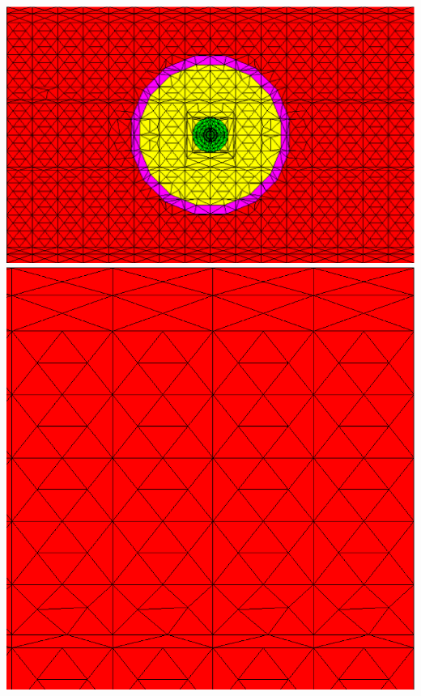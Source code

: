 \documentclass[compress,10pt]{beamer}
\begin{document}
\begin{frame}[t]
{\centering
{}\includegraphics[width=0.52\columnwidth]{images/IM1_30_rot.eps} \hspace{1.0cm}
{}\includegraphics[width=0.345\columnwidth]{images/IM1_zoom.eps}
}
\end{frame}
\end{document}
